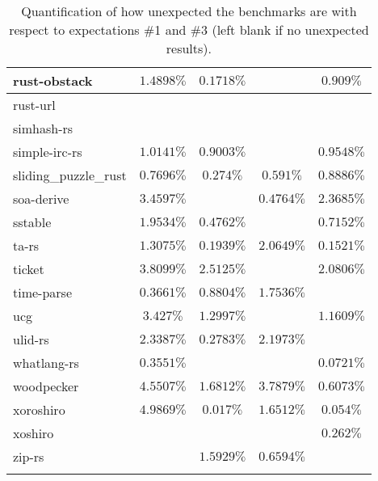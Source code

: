 \documentclass{article}
\begin{document}
\begin{longtable}[h!]{|l|c|c|c|c|}
    \hline
    rust-obstack & $1.4898\%$ & $0.1718\%$ &  & $0.909\%$ \\ %
    \hline
    rust-url &  &  &  &  \\ %
    \hline
    simhash-rs &  &  &  &  \\ %
    \hline
    simple-irc-rs & $1.0141\%$ & $0.9003\%$ &  & $0.9548\%$ \\ %
    \hline
    sliding\_puzzle\_rust & $0.7696\%$ & $0.274\%$ & $0.591\%$ & $0.8886\%$ \\ %
     \hline
    soa-derive & $3.4597\%$ &  & $0.4764\%$ & $2.3685\%$ \\ %
    \hline
    sstable & $1.9534\%$ & $0.4762\%$ &  & $0.7152\%$ \\ %
     \hline
    ta-rs & $1.3075\%$ & $0.1939\%$ & $2.0649\%$ & $0.1521\%$ \\ %
    \hline
    ticket & $3.8099\%$ & $2.5125\%$ &  & $2.0806\%$ \\ %
    \hline
    time-parse & $0.3661\%$ & $0.8804\%$ & $1.7536\%$ &  \\ %
    \hline
    ucg & $3.427\%$ & $1.2997\%$ &  & $1.1609\%$ \\ %
    \hline
    ulid-rs & $2.3387\%$ & $0.2783\%$ & $2.1973\%$ &  \\ %
    \hline
    whatlang-rs & $0.3551\%$ &  &  & $0.0721\%$ \\ %
     \hline
    woodpecker & $4.5507\%$ & $1.6812\%$ & $3.7879\%$ & $0.6073\%$ \\ %
    \hline
    xoroshiro & $4.9869\%$ & $0.017\%$ & $1.6512\%$ & $0.054\%$ \\ %
    \hline
    xoshiro &  &  &  & $0.262\%$ \\ %
    \hline
    zip-rs &  & $1.5929\%$ & $0.6594\%$ &  \\ %
    \hline
  \caption{Quantification of how unexpected the benchmarks are with respect to expectations \#1 and \#3 (left blank if no unexpected results).}
  \label{table:quant13}
\end{longtable}
\end{document}

